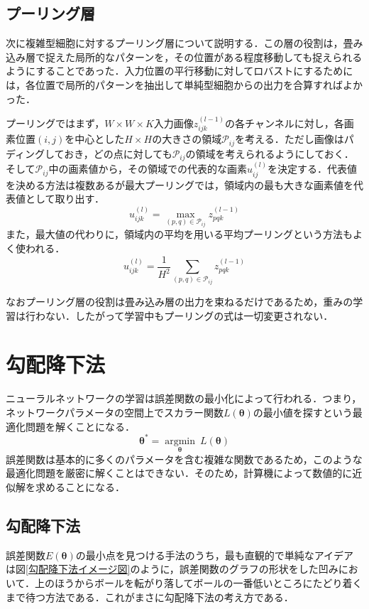 \documentclass[a4paper,11pt]{jsreport}
\begin{document}
\subsection{プーリング層}
次に複雑型細胞に対するプーリング層について説明する．この層の役割は，畳み込み層で捉えた局所的なパターンを，その位置がある程度移動しても捉えられるようにすることであった．入力位置の平行移動に対してロバストにするためには，各位置で局所的パターンを抽出して単純型細胞からの出力を合算すればよかった．\par
プーリングではまず，$W \times W \times K$入力画像$z_{ijk}^{(l-1)}$の各チャンネルに対し，各画素位置$(i,j)$を中心とした$H \times H$の大きさの領域$\mathcal{P}_{ij}$を考える．ただし画像はパディングしておき，どの点に対しても$\mathcal{P}_{ij}$の領域を考えられるようにしておく．そして$\mathcal{P}_{ij}$中の画素値から，その領域での代表的な画素$u_{ij}^{(l)}$を決定する．代表値を決める方法は複数あるが最大プーリングでは，領域内の最も大きな画素値を代表値として取り出す．
\begin{equation}
  u_{ijk}^{(l)}
  = \underset{(p,q) \in \mathcal{P}_{ij}} {\operatorname{max}} z_{pqk}^{(l-1)} 
\end{equation}
また，最大値の代わりに，領域内の平均を用いる平均プーリングという方法もよく使われる．
\begin{equation}
  u_{ijk}^{(l)}
  = \frac{1}{H^2} \sum_{(p,q) \in \mathcal{P}_{ij}} z_{pqk}^{(l-1)} 
\end{equation}\par
なおプーリング層の役割は畳み込み層の出力を束ねるだけであるため，重みの学習は行わない．したがって学習中もプーリングの式は一切変更されない．



\section{勾配降下法}
ニューラルネットワークの学習は誤差関数の最小化によって行われる．つまり，ネットワークパラメータの空間上でスカラー関数$L(\bm{\theta})$の最小値を探すという最適化問題を解くことになる．
\begin{equation}
  \bm{\theta}^* = \underset{\bm{\theta}} {\operatorname{argmin}} \ L(\bm{\theta})
\end{equation}
誤差関数は基本的に多くのパラメータを含む複雑な関数であるため，このような最適化問題を厳密に解くことはできない．そのため，計算機によって数値的に近似解を求めることになる．\par

\subsection{勾配降下法}
誤差関数$E(\bm{\theta})$の最小点を見つける手法のうち，最も直観的で単純なアイデアは図\ref{勾配降下法イメージ図}のように，誤差関数のグラフの形状をした凹みにおいて．上のほうからボールを転がり落してボールの一番低いところにたどり着くまで待つ方法である．これがまさに勾配降下法の考え方である．\par
\end{document}
